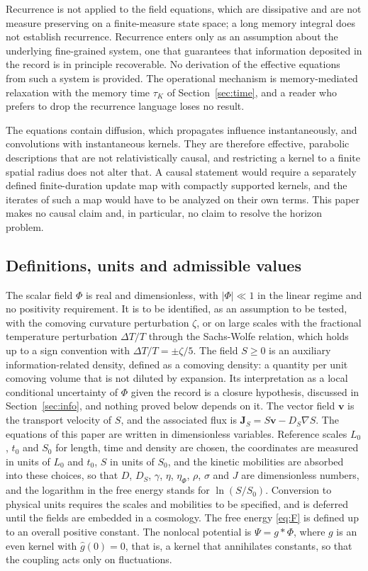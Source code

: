 \documentclass[11pt]{article}
\theoremstyle{definition}
\theoremstyle{remark}
\newcommand{\vv}{\mathbf{v}}
\begin{document}
Recurrence is not applied to the field equations, which are dissipative and are not measure preserving on a finite-measure state space; a long memory integral does not establish recurrence. Recurrence enters only as an assumption about the underlying fine-grained system, one that guarantees that information deposited in the record is in principle recoverable. No derivation of the effective equations from such a system is provided. The operational mechanism is memory-mediated relaxation with the memory time $\tau_K$ of Section~\ref{sec:time}, and a reader who prefers to drop the recurrence language loses no result.

The equations contain diffusion, which propagates influence instantaneously, and convolutions with instantaneous kernels. They are therefore effective, parabolic descriptions that are not relativistically causal, and restricting a kernel to a finite spatial radius does not alter that. A causal statement would require a separately defined finite-duration update map with compactly supported kernels, and the iterates of such a map would have to be analyzed on their own terms. This paper makes no causal claim and, in particular, no claim to resolve the horizon problem.

\subsection{Definitions, units and admissible values}\label{sec:defs}

The scalar field $\Phi$ is real and dimensionless, with $|\Phi|\ll1$ in the linear regime and no positivity requirement. It is to be identified, as an assumption to be tested, with the comoving curvature perturbation $\zeta$, or on large scales with the fractional temperature perturbation $\Delta T/T$ through the Sachs-Wolfe relation, which holds up to a sign convention with $\Delta T/T=\pm\zeta/5$. The field $S\ge0$ is an auxiliary information-related density, defined as a comoving density: a quantity per unit comoving volume that is not diluted by expansion. Its interpretation as a local conditional uncertainty of $\Phi$ given the record is a closure hypothesis, discussed in Section~\ref{sec:info}, and nothing proved below depends on it. The vector field $\vv$ is the transport velocity of $S$, and the associated flux is $\mathbf J_S=S\vv-D_S\nabla S$. The equations of this paper are written in dimensionless variables. Reference scales $L_0$, $t_0$ and $S_0$ for length, time and density are chosen, the coordinates are measured in units of $L_0$ and $t_0$, $S$ in units of $S_0$, and the kinetic mobilities are absorbed into these choices, so that $D$, $D_S$, $\gamma$, $\eta$, $\eta_\Phi$, $\rho$, $\sigma$ and $J$ are dimensionless numbers, and the logarithm in the free energy stands for $\ln(S/S_0)$. Conversion to physical units requires the scales and mobilities to be specified, and is deferred until the fields are embedded in a cosmology. The free energy \eqref{eq:F} is defined up to an overall positive constant. The nonlocal potential is $\Psi=g*\Phi$, where $g$ is an even kernel with $\hat g(0)=0$, that is, a kernel that annihilates constants, so that the coupling acts only on fluctuations. 
\end{document}
